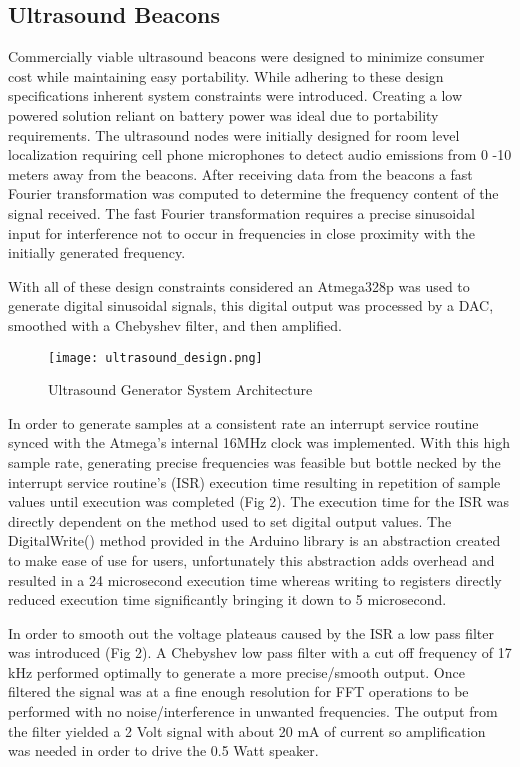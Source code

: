 \subsection{Ultrasound Beacons}
\label{sec:ultrasound-beacons}


	Commercially viable ultrasound beacons were designed to minimize consumer cost while maintaining easy portability.  While adhering to these design specifications inherent system constraints were introduced. Creating a low powered solution reliant on battery power was ideal due to portability requirements.  The ultrasound nodes were initially designed for room level localization requiring cell phone microphones to detect audio emissions from 0 -10 meters away from the beacons. After receiving data from the beacons a fast Fourier transformation was computed to determine the frequency content of the signal received.  The fast Fourier transformation requires a precise sinusoidal input for interference not to occur in frequencies in close proximity with the initially generated frequency.  

	With all of these design constraints considered an Atmega328p was used to generate digital sinusoidal signals, this digital output was processed by a DAC, smoothed with a Chebyshev filter, and then amplified.  
 
\begin{figure}[h]
  \centering
  \texttt{[image: ultrasound\_design.png]}
  \caption{Ultrasound Generator System Architecture}
  \label{fig:ultrasound_design}
\end{figure}


	In order to generate samples at a consistent rate an interrupt service routine synced with the Atmega’s internal 16MHz clock was implemented. With this high sample rate,  generating precise frequencies was feasible but bottle necked by the interrupt service routine's (ISR) execution time resulting in repetition of sample values until execution was completed  (Fig  2). The execution time for the ISR was directly dependent on the method used to set digital output values. The DigitalWrite() method provided in the Arduino library is an abstraction created to make ease of use for users, unfortunately this abstraction adds overhead and resulted in a 24 microsecond execution time whereas writing to registers directly reduced execution time significantly bringing it down to 5 microsecond.  

	In order to smooth out the voltage plateaus caused by the ISR a low pass filter was introduced (Fig 2). A Chebyshev low pass filter with a cut off frequency of 17 kHz performed optimally to generate a more precise/smooth output.  Once filtered the signal was at a fine enough resolution for FFT operations to be performed with no noise/interference in unwanted frequencies.  The output from the filter yielded a 2 Volt signal with about 20 mA of current so amplification was needed in order to drive the 0.5 Watt speaker. 

